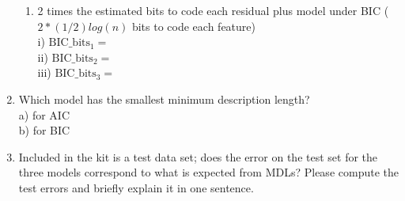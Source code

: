 \begin{enumerate}
\begin{enumerate}
\item 2 times the estimated bits to code each residual plus model under BIC  ($2*(1/2) log(n)$ bits to code each feature) \\
i)   $\text{BIC}\_\text{bits}_1 = $ \\
ii)  $\text{BIC}\_\text{bits}_2 = $ \\
iii) $\text{BIC}\_\text{bits}_3 = $ \\

\end{enumerate}


\item Which model has the smallest minimum description length? \\
a) for AIC \\
b) for BIC\\


\item  Included in the kit is a test data set; does the error on the test set for the three models
   correspond to what is expected from MDLs?  Please compute the test errors and briefly explain it in one sentence.


\end{enumerate}

